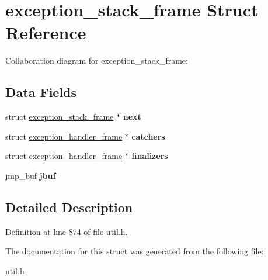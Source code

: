 \hypertarget{structexception__stack__frame}{}\section{exception\+\_\+stack\+\_\+frame Struct Reference}
\label{structexception__stack__frame}


Collaboration diagram for exception\+\_\+stack\+\_\+frame\+:
\subsection*{Data Fields}
\begin{DoxyCompactItemize}
\item 
struct \hyperlink{structexception__stack__frame}{exception\+\_\+stack\+\_\+frame} $\ast$ {\bfseries next}\hypertarget{structexception__stack__frame_abb538d9a6f6155ed83f140dd2adb7457}{}\label{structexception__stack__frame_abb538d9a6f6155ed83f140dd2adb7457}

\item 
struct \hyperlink{structexception__handler__frame}{exception\+\_\+handler\+\_\+frame} $\ast$ {\bfseries catchers}\hypertarget{structexception__stack__frame_a950ab78cc930f9662ff9cb7eedcfda79}{}\label{structexception__stack__frame_a950ab78cc930f9662ff9cb7eedcfda79}

\item 
struct \hyperlink{structexception__handler__frame}{exception\+\_\+handler\+\_\+frame} $\ast$ {\bfseries finalizers}\hypertarget{structexception__stack__frame_a543e62e78b4b2777e9df32ccc5feba38}{}\label{structexception__stack__frame_a543e62e78b4b2777e9df32ccc5feba38}

\item 
jmp\+\_\+buf {\bfseries jbuf}\hypertarget{structexception__stack__frame_a6f81386a697bcae78000625ee8ba02fa}{}\label{structexception__stack__frame_a6f81386a697bcae78000625ee8ba02fa}

\end{DoxyCompactItemize}


\subsection{Detailed Description}


Definition at line 874 of file util.\+h.



The documentation for this struct was generated from the following file\+:\begin{DoxyCompactItemize}
\item 
\hyperlink{util_8h}{util.\+h}\end{DoxyCompactItemize}

